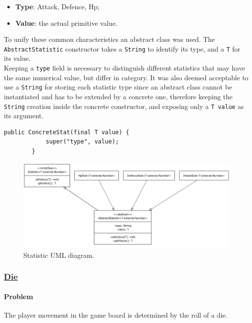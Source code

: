 \documentclass[12pt, a4paper]{report}
\theoremstyle{definition}
\begin{document}
    \begin{itemize}
        \item \textbf{Type}: Attack, Defence, Hp;
        \item \textbf{Value}: the actual primitive value.
    \end{itemize}
    
    To unify these common characteristics an abstract class was used. The \verb|AbstractStatistic| constructor takes a \verb|String| to identify its type, and a
    \verb|T| for its value.\\
    Keeping a \verb|type| field is necessary to distinguish different statistics that may have the same numerical value, but differ in category.
    It was also deemed acceptable to use a \verb|String| for storing each statistic type since an abstract class cannot be instantiated and has to be extended by
    a concrete one, therefore keeping the \verb|String| creation inside the concrete constructor, and exposing only a \verb|T value| as its argument.

    \begin{lstlisting}[caption={Example of a concrete stat constructor.}, gobble=8]
        public ConcreteStat(final T value) {
            super("type", value);
        }
    \end{lstlisting}

    \begin{figure}[h]
    \centering{}
    \caption{Statistic UML diagram.}
    \includegraphics[width=\textwidth]{statistic_uml}
    \end{figure}

    \subsubsection{\underline{Die}}
    \paragraph{Problem}
    The player movement in the game board is determined by the roll of a die.
\end{document}
